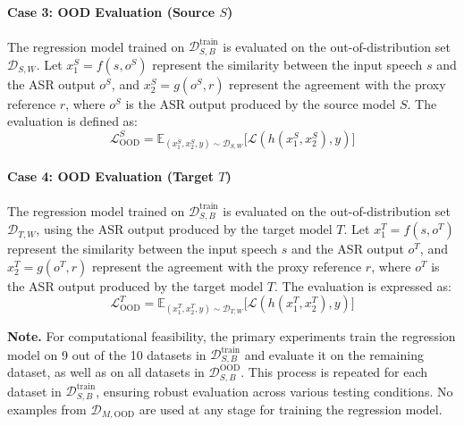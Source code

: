 \paragraph{Case 3: OOD Evaluation (Source \(S\))}\label{para:case_3_data_ood_eval}
The regression model trained on $\mathcal{D}_{S,B}^{\text{train}}$ is evaluated on the out-of-distribution set $\mathcal{D}_{S, W}$. Let \(x_1^S = f(s, o^S)\) represent the similarity between the input speech \(s\) and the ASR output \(o^S\), and \(x_2^S = g(o^S, r)\) represent the agreement with the proxy reference \(r\), where \(o^S\) is the ASR output produced by the source model \(S\). The evaluation is defined as:
\begin{equation}
\mathcal{L}_{\text{OOD}}^S = \mathbb{E}_{(x_1^S, x_2^S, y) \sim \mathcal{D}_{S, W}} \big[\mathcal{L}(h(x_1^S, x_2^S), y)\big]
\end{equation}

\paragraph{Case 4: OOD Evaluation (Target \(T\))}\label{para:case_4_data_ood_eval}
The regression model trained on $\mathcal{D}_{S,B}^{\text{train}}$ is evaluated on the out-of-distribution set $\mathcal{D}_{T, W}$, using the ASR output produced by the target model \(T\). Let \(x_1^T = f(s, o^T)\) represent the similarity between the input speech \(s\) and the ASR output \(o^T\), and \(x_2^T = g(o^T, r)\) represent the agreement with the proxy reference \(r\), where \(o^T\) is the ASR output produced by the target model \(T\). The evaluation is expressed as:
\begin{equation}
\mathcal{L}_{\text{OOD}}^T = \mathbb{E}_{(x_1^T, x_2^T, y) \sim \mathcal{D}_{T, W}} \big[\mathcal{L}(h(x_1^T, x_2^T), y)\big]
\end{equation}


\noindent\textbf{Note.} For computational feasibility, the primary experiments train the regression model on 9 out of the 10 datasets in $\mathcal{D}_{S,B}^{\text{train}}$ and evaluate it on the remaining dataset, as well as on all {\nwilds} datasets in $\mathcal{D}_{S,B}^{\text{OOD}}$. This process is repeated for each dataset in $\mathcal{D}_{S,B}^{\text{train}}$, ensuring robust evaluation across various testing conditions. No examples from $\mathcal{D}_{M,\text{OOD}}$ are used at any stage for training the regression model.


